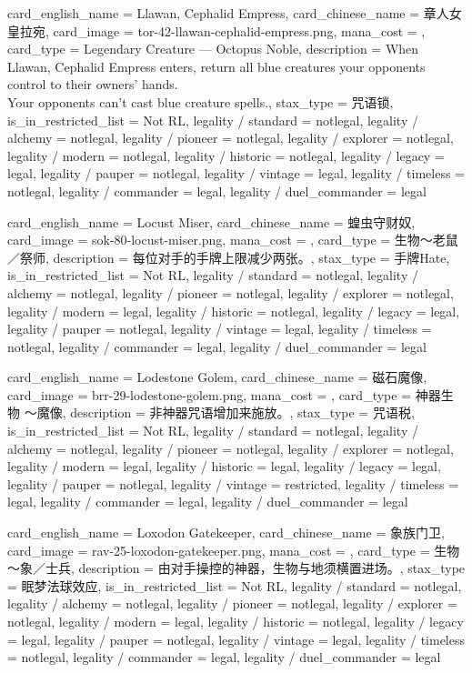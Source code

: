 \documentclass[lang = cn, color = black, 10pt]{AllThatStax}
\begin{document}
\card
{
	card_english_name = {Llawan, Cephalid Empress},
	card_chinese_name = {章人女皇拉宛},
	card_image = tor-42-llawan-cephalid-empress.png,
	mana_cost = ,
	card_type = Legendary Creature — Octopus Noble,
	description = {When Llawan, Cephalid Empress enters, return all blue creatures your opponents control to their owners' hands.\\
		Your opponents can't cast blue creature spells.},
	stax_type = 咒语锁,
	is_in_restricted_list = Not RL,
	legality / standard = notlegal,
	legality / alchemy = notlegal,
	legality / pioneer = notlegal,
	legality / explorer = notlegal,
	legality / modern = notlegal,
	legality / historic = notlegal,
	legality / legacy = legal,
	legality / pauper = notlegal,
	legality / vintage = legal,
	legality / timeless = notlegal,
	legality / commander = legal,
	legality / duel_commander = legal
}

\card
{
	card_english_name = {Locust Miser},
	card_chinese_name = {蝗虫守财奴},
	card_image = sok-80-locust-miser.png,
	mana_cost = ,
	card_type = 生物～老鼠／祭师,
	description = {每位对手的手牌上限减少两张。},
	stax_type = 手牌Hate,
	is_in_restricted_list = Not RL,
	legality / standard = notlegal,
	legality / alchemy = notlegal,
	legality / pioneer = notlegal,
	legality / explorer = notlegal,
	legality / modern = legal,
	legality / historic = notlegal,
	legality / legacy = legal,
	legality / pauper = notlegal,
	legality / vintage = legal,
	legality / timeless = notlegal,
	legality / commander = legal,
	legality / duel_commander = legal
}

\card
{
	card_english_name = {Lodestone Golem},
	card_chinese_name = {磁石魔像},
	card_image = brr-29-lodestone-golem.png,
	mana_cost = ,
	card_type = 神器生物 ～魔像,
	description = {非神器咒语增加来施放。},
	stax_type = 咒语税,
	is_in_restricted_list = Not RL,
	legality / standard = notlegal,
	legality / alchemy = notlegal,
	legality / pioneer = notlegal,
	legality / explorer = notlegal,
	legality / modern = legal,
	legality / historic = legal,
	legality / legacy = legal,
	legality / pauper = notlegal,
	legality / vintage = restricted,
	legality / timeless = legal,
	legality / commander = legal,
	legality / duel_commander = legal
}

\card
{
	card_english_name = {Loxodon Gatekeeper},
	card_chinese_name = {象族门卫},
	card_image = rav-25-loxodon-gatekeeper.png,
	mana_cost = ,
	card_type = 生物～象／士兵,
	description = {由对手操控的神器，生物与地须横置进场。},
	stax_type = 眠梦法球效应,
	is_in_restricted_list = Not RL,
	legality / standard = notlegal,
	legality / alchemy = notlegal,
	legality / pioneer = notlegal,
	legality / explorer = notlegal,
	legality / modern = legal,
	legality / historic = notlegal,
	legality / legacy = legal,
	legality / pauper = notlegal,
	legality / vintage = legal,
	legality / timeless = notlegal,
	legality / commander = legal,
	legality / duel_commander = legal
}
\end{document}
